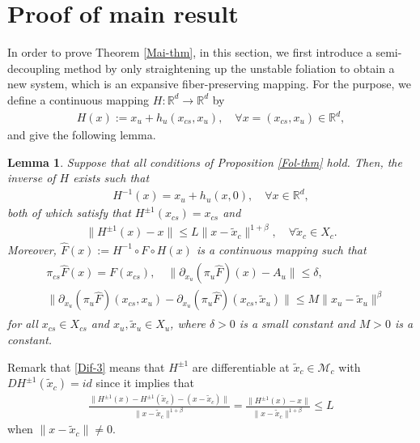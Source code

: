 \documentclass[reqno]{amsart}
\numberwithin{equation}{section}
\newtheorem{lemma}[theorem]{Lemma}
\begin{document}
\section{Proof of main result}\label{sec-diff}


In order to prove Theorem \ref{Mai-thm}, in this section, we first introduce a semi-decoupling method by only straightening up the unstable foliation to obtain a new system, which is an expansive fiber-preserving mapping. For the purpose, we define a continuous mapping $H:\mathbb{R}^d \to \mathbb{R}^d$ by
\begin{align}\label{Dec-1}
H(x):=x_u+ h_u(x_{cs}, x_u), \quad \forall x=(x_{cs},x_u)\in\mathbb{R}^d,
\end{align}
and give the following lemma.
\begin{lemma}\label{dec-lem}
Suppose that all conditions of Proposition {\rm \ref{Fol-thm}} hold. Then, the inverse of $H$ exists such that
\begin{align}\label{Dec-2}
H^{-1}(x)=x_u+h_u(x,0), \quad \forall x\in\mathbb{R}^d,
\end{align}
both of which satisfy that $H^{\pm 1}(x_{cs})=x_{cs}$ and
\begin{align}\label{Dif-3}
\|H^{\pm 1}(x)-x\|\le L\|x-\tilde{x}_c\|^{1+\beta},\quad \forall \tilde{x}_c\in X_c.
\end{align}
Moreover,
$
\hat{F}(x):=H^{-1} \circ F \circ H(x)
$
is a continuous mapping such that
\begin{align}\label{xu-F}
\begin{split}
&\pi_{cs} \hat{F}(x)=F(x_{cs}),\quad \|\partial_{x_u}(\pi_u\hat{F})(x)-A_u\|\le \delta,
\\
&\|\partial_{x_u}(\pi_u\hat{F})(x_{cs},x_u)-\partial_{x_u}(\pi_u\hat{F})(x_{cs},\tilde x_u)\|\le M\|x_u-\tilde x_u\|^\beta %
\end{split}
\end{align}
for all $x_{cs}\in X_{cs}$ and $x_u,\tilde x_u\in X_u$,
where $\delta>0$ is a small constant and $M>0$ is a constant.
\end{lemma}

Remark that \eqref{Dif-3} means that $H^{\pm 1}$ are differentiable at $\tilde x_c\in \mathcal{M}_c$  with $DH^{\pm 1}(\tilde x_c)=id$ since it implies that
\begin{align}\label{DH0}
\frac{\|H^{\pm 1}(x)-H^{\pm 1}(\tilde x_c)-(x-\tilde x_c)\|}{\|x-\tilde x_c\|^{1+\beta}}=\frac{\|H^{\pm 1}(x)-x\|}{\|x-\tilde x_c\|^{1+\beta}}\le L
\end{align}
when $\|x-\tilde x_c\|\ne 0$.
\end{document}
